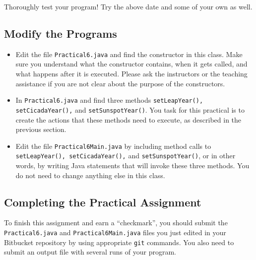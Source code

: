 \noindent Thoroughly test your program! Try the above date and some of your own as well.

\vspace*{-.1in}
\subsection*{Modify the Programs} 
\vspace*{-.05in}
\begin{itemize}
\item Edit the file {\tt Practical6.java} and find the constructor in this class. Make sure you understand what the constructor contains, when it gets called, and what happens after it is executed. Please ask the instructors or the teaching assistance if you are not clear about the purpose of the constructors. 
\item  In {\tt Practical6.java} and find three methods {\tt setLeapYear(), setCicadaYear(),} and {\tt  setSunspotYear()}. You task for this practical is to create the actions that these methods need to execute, as described in the previous section. 
\item Edit the file {\tt Practical6Main.java} by including method calls to {\tt setLeapYear(), setCicadaYear(),} and {\tt  setSunspotYear()}, or in other words, by writing Java statements that will invoke these three methods. You do not need to change anything else in this class.
\end{itemize}

\vspace*{-.15in}
\subsection*{Completing the Practical Assignment}
\vspace*{-.1in}
To finish this assignment and earn a ``checkmark'', you should 
submit the {\tt Practical6.java} and {\tt Practical6Main.java} files you just edited
in your Bitbucket repository by
using appropriate {\tt git} commands. You also need to submit an output file with several runs of your program.

\vspace*{-.15in}
